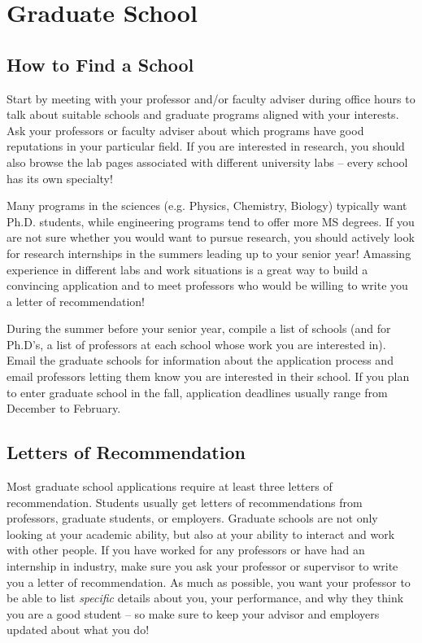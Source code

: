 \chapter*{Graduate School}

\section*{How to Find a School}

Start by meeting with your professor and/or faculty adviser during office hours to talk about suitable schools and graduate programs aligned with your interests. Ask your professors or faculty adviser about which programs have good reputations in your particular field. If you are interested in research, you should also browse the lab pages associated with different university labs -- every school has its own specialty! 

Many programs in the sciences (e.g. Physics, Chemistry, Biology) typically want Ph.D. students, while engineering programs tend to offer more MS degrees. If you are not sure whether you would want to pursue research, you should actively look for research internships in the summers leading up to your senior year! Amassing experience in different labs and work situations is a great way to build a convincing application and to meet professors who would be willing to write you a letter of recommendation!

During the summer before your senior year, compile a list of schools (and for Ph.D's, a list of professors at each school whose work you are interested in). Email the graduate schools for information about the application process and email professors letting them know you are interested in their school. If you plan to enter graduate school in the fall, application deadlines usually range from December to February. 
\section*{Letters of Recommendation}

Most graduate school applications require at least three letters of recommendation. Students usually get letters of recommendations from professors, graduate students, or employers. Graduate schools are not only looking at your academic ability, but also at your ability to interact and work with other people. If you have worked for any professors or have had an internship in industry, make sure you ask your professor or supervisor to write you a letter of recommendation. As much as possible, you want your professor to be able to list \emph{specific} details about you, your performance, and why they think you are a good student -- so make sure to keep your advisor and employers updated about what you do!

